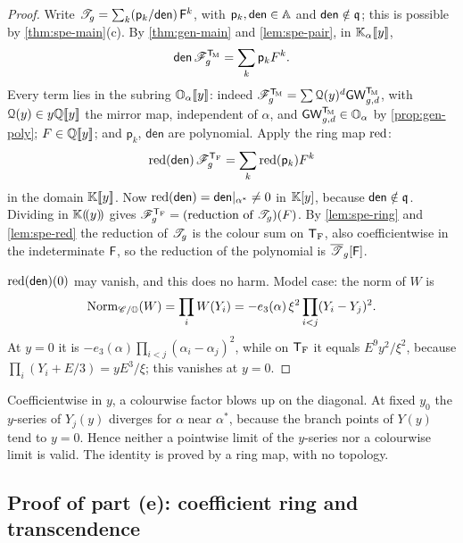 \begin{proof}
Write $\mathscr{T}_g=\sum_k(\mathsf{p}_k/\mathsf{den})\,\mathsf{F}^k$, with $\mathsf{p}_k,\mathsf{den}\in\mathbb{A}$ and $\mathsf{den}\notin\mathfrak{q}$; this is possible by \cref{thm:spe-main}(c). By \cref{thm:gen-main} and \cref{lem:spe-pair}, in $\mathbb{K}_{\alpha}[\![ y ]\!]$,
\[
\mathsf{den}\,\mathscr{F}_g^{\mathsf{T}_{\!\mathrm{M}}}=\sum_k\mathsf{p}_kF^k.
\]
Every term lies in the subring $\mathbb{O}_{\alpha}[\![ y ]\!]$: indeed $\mathscr{F}_g^{\mathsf{T}_{\!\mathrm{M}}}=\sum\mathcal{Q}(y)^d\mathsf{GW}_{g,d}^{\mathsf{T}_{\!\mathrm{M}}}$, with $\mathcal{Q}(y)\in y\mathbb{Q}[\![ y ]\!]$ the mirror map, independent of $\alpha$, and $\mathsf{GW}_{g,d}^{\mathsf{T}_{\!\mathrm{M}}}\in\mathbb{O}_{\alpha}$ by \cref{prop:gen-poly}; $F\in\mathbb{Q}[\![ y ]\!]$; and $\mathsf{p}_k$, $\mathsf{den}$ are polynomial. Apply the ring map $\mathrm{red}$:
\[
\mathrm{red}(\mathsf{den})\,\mathscr{F}_g^{\mathsf{T}_{\mathrm{F}}}=\sum_k\mathrm{red}(\mathsf{p}_k)F^k
\]
in the domain $\mathbb{K}[\![ y ]\!]$. Now $\mathrm{red}(\mathsf{den})=\mathsf{den}|_{\alpha^*}\neq0$ in $\mathbb{K}[y]$, because $\mathsf{den}\notin\mathfrak{q}$. Dividing in $\mathbb{K}(\!(y)\!)$ gives $\mathscr{F}_g^{\mathsf{T}_{\mathrm{F}}}=(\text{reduction of }\mathscr{T}_g)(F)$. By \cref{lem:spe-ring} and \cref{lem:spe-red} the reduction of $\mathscr{T}_g$ is the colour sum on $\mathsf{T}_{\mathrm{F}}$, also coefficientwise in the indeterminate $\mathsf{F}$, so the reduction of the polynomial is $\overline{\mathscr{T}}_g[\mathsf{F}]$.

$\mathrm{red}(\mathsf{den})(0)$ may vanish, and this does no harm. Model case: the norm of $W$ is
\[
\mathrm{Norm}_{\mathscr{C}/\mathbb{O}}(W)=\prod_iW(Y_i)=-e_3(\alpha)\,\xi^2\prod_{i<j}(Y_i-Y_j)^2.
\]
At $y=0$ it is $-e_3(\alpha)\prod_{i<j}(\alpha_i-\alpha_j)^2$, while on $\mathsf{T}_{\mathrm{F}}$ it equals $E^9y^2/\xi^2$, because $\prod_i(Y_i+E/3)=yE^3/\xi$; this vanishes at $y=0$.
\end{proof}

\begin{rmk}
\label{rmk:spe-nolimit}
Coefficientwise in $y$, a colourwise factor blows up on the diagonal. At fixed $y_0$ the $y$-series of $Y_j(y)$ diverges for $\alpha$ near $\alpha^*$, because the branch points of $Y(y)$ tend to $y=0$. Hence neither a pointwise limit of the $y$-series nor a colourwise limit is valid. The identity is proved by a ring map, with no topology.
\end{rmk}

\subsection{Proof of part (e): coefficient ring and transcendence}


